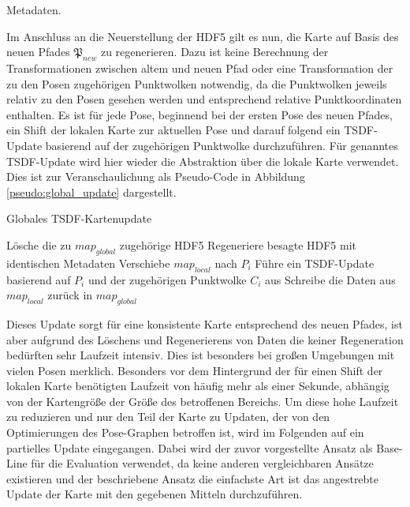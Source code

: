 Metadaten. 

Im Anschluss an die Neuerstellung der HDF5 gilt es nun, die Karte auf Basis des neuen Pfades $\mathfrak{P}_{new}$ zu regenerieren. Dazu ist keine Berechnung der Transformationen zwischen altem und neuen Pfad oder eine Transformation der zu den Posen zugehörigen Punktwolken notwendig, da die Punktwolken jeweils relativ zu den Posen gesehen werden und entsprechend relative Punktkoordinaten enthalten. Es ist für jede Pose, beginnend bei der ersten Pose des neuen Pfades, ein Shift der lokalen Karte zur aktuellen Pose und darauf folgend ein TSDF-Update basierend auf der zugehörigen Punktwolke durchzuführen. Für genanntes TSDF-Update wird hier wieder die Abstraktion über die lokale Karte verwendet. Dies ist zur Veranschaulichung als Pseudo-Code in Abbildung \ref{pseudo:global_update} dargestellt.

\begin{algorithm}[H]
\caption{Globales TSDF-Kartenupdate} \label{pseudo:global_update}
\begin{algorithmic}[1]
	\State Lösche die zu $map_{global}$ zugehörige HDF5
	\State Regeneriere besagte HDF5 mit identischen Metadaten
		\State Verschiebe $map_{local}$ nach $P_i$
		\State Führe ein TSDF-Update basierend auf $P_i$ und der zugehörigen Punktwolke $C_i$ aus
		\State Schreibe die Daten aus $map_{local}$ zurück in $map_{global}$
	\EndFor
\EndProcedure
\end{algorithmic}
\end{algorithm}

Dieses Update sorgt für eine konsistente Karte entsprechend des neuen Pfades, ist aber aufgrund des Löschens und Regenerierens von Daten die keiner Regeneration bedürften sehr Laufzeit intensiv. Dies ist besonders bei großen Umgebungen mit vielen Posen merklich. Besonders vor dem Hintergrund der für einen Shift der lokalen Karte benötigten Laufzeit von häufig mehr als einer Sekunde, abhängig von der Kartengröße der Größe des betroffenen Bereichs. Um diese hohe Laufzeit zu reduzieren und nur den Teil der Karte zu Updaten, der von den Optimierungen des Pose-Graphen betroffen ist, wird im Folgenden auf ein partielles Update eingegangen. Dabei wird der zuvor vorgestellte Ansatz als Base-Line für die Evaluation verwendet, da keine anderen vergleichbaren Ansätze existieren und der beschriebene Ansatz die einfachste Art ist das angestrebte Update der Karte mit den gegebenen Mitteln durchzuführen.


